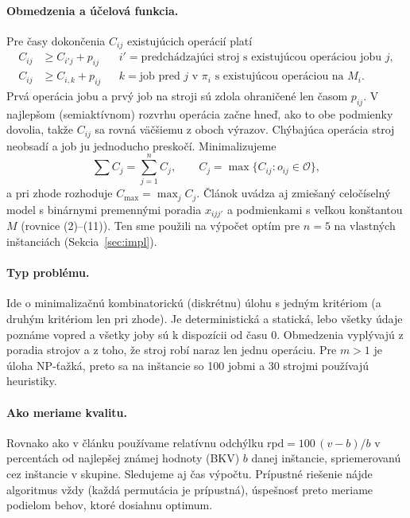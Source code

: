 \documentclass[11pt,a4paper]{article}
\newcommand{\Csum}{\sum C_j}
\begin{document}
\paragraph{Obmedzenia a účelová funkcia.} Pre časy dokončenia $C_{ij}$ existujúcich operácií platí
\begin{align}
  C_{ij} &\ge C_{i'j} + p_{ij} && i' = \text{predchádzajúci stroj s existujúcou operáciou jobu } j,\\
  C_{ij} &\ge C_{i,k} + p_{ij} && k = \text{job pred } j \text{ v } \pi_i \text{ s existujúcou operáciou na } M_i.
\end{align}
Prvá operácia jobu a prvý job na stroji sú zdola ohraničené len časom $p_{ij}$. V najlepšom
(semiaktívnom) rozvrhu operácia začne hneď, ako to obe podmienky dovolia, takže $C_{ij}$ sa
rovná väčšiemu z oboch výrazov. Chýbajúca operácia stroj neobsadí a job ju jednoducho preskočí.
Minimalizujeme
\[
  \Csum = \sum_{j=1}^{n} C_j, \qquad C_j = \max\{C_{ij} : o_{ij}\in\mathcal{O}\},
\]
a pri zhode rozhoduje $C_{\max}=\max_j C_j$. Článok uvádza aj zmiešaný celočíselný model
s binárnymi premennými poradia $x_{ijj'}$ a podmienkami s veľkou konštantou $M$ (rovnice
(2)–(11)). Ten sme použili na výpočet optím pre $n=5$ na vlastných inštanciách (Sekcia~\ref{sec:impl}).

\paragraph{Typ problému.} Ide o minimalizačnú kombinatorickú (diskrétnu) úlohu s jedným
kritériom (a druhým kritériom len pri zhode). Je deterministická a statická, lebo všetky údaje
poznáme vopred a všetky joby sú k dispozícii od času 0. Obmedzenia vyplývajú z poradia strojov
a z toho, že stroj robí naraz len jednu operáciu. Pre $m>1$ je úloha NP-ťažká, preto sa na
inštancie so 100 jobmi a 30 strojmi používajú heuristiky.

\paragraph{Ako meriame kvalitu.} Rovnako ako v článku používame relatívnu odchýlku
$\mathrm{rpd} = 100\,(v-b)/b$ v percentách od najlepšej známej hodnoty (BKV) $b$ danej
inštancie, spriemerovanú cez inštancie v skupine. Sledujeme aj čas výpočtu. Prípustné
riešenie nájde algoritmus vždy (každá permutácia je prípustná), úspešnosť preto meriame
podielom behov, ktoré dosiahnu optimum.

\end{document}
